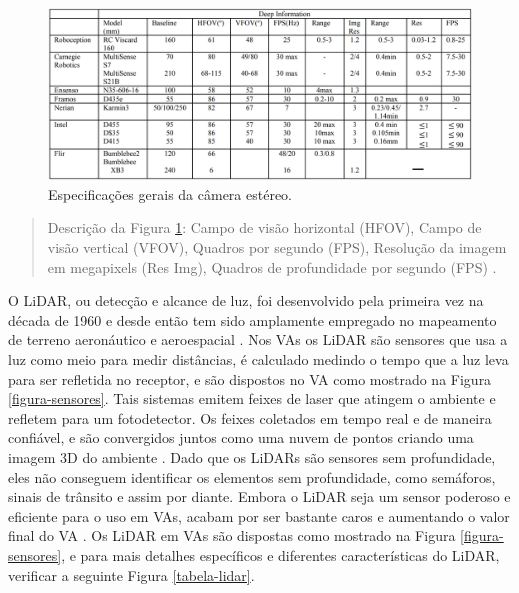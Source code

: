 \begin{figure}[H]
\centering
\includegraphics[width=\textwidth]{Figures/camera-table.png}
\caption{Especificações gerais da câmera estéreo.}
\label{tabela-camera}
\end{figure}
\begin{quote}
Descrição da Figura \ref{tabela-camera}: Campo de visão horizontal (HFOV), Campo de visão vertical (VFOV), Quadros por segundo (FPS), Resolução da imagem em megapixels (Res Img), Quadros de profundidade por segundo (FPS) \cite{sensors}.
\end{quote}

O LiDAR, ou detecção e alcance de luz, foi desenvolvido pela primeira vez na década de 1960 e desde então tem sido amplamente empregado no mapeamento de terreno aeronáutico e aeroespacial \cite{sensors}. Nos VAs os LiDAR são sensores que usa a luz como meio para medir distâncias, é calculado medindo o tempo que a luz leva para ser refletida no receptor, e são dispostos no VA como mostrado na Figura \ref{figura-sensores}. Tais sistemas emitem feixes de laser que atingem o ambiente e refletem para um fotodetector. Os feixes coletados em tempo real e de maneira confiável, e  são convergidos juntos como uma nuvem de pontos criando uma imagem 3D do ambiente \cite{aplicacao2}. Dado que os LiDARs são sensores sem profundidade, eles não conseguem identificar os elementos sem profundidade, como semáforos, sinais de trânsito e assim por diante.
Embora o LiDAR seja um sensor poderoso e eficiente para o uso em VAs, acabam por ser bastante caros e aumentando o valor final do VA \cite{review-auto}. 
Os LiDAR em VAs são dispostas como mostrado na Figura \ref{figura-sensores}, e para mais detalhes específicos e diferentes características do LiDAR, verificar a seguinte Figura \ref{tabela-lidar}.

